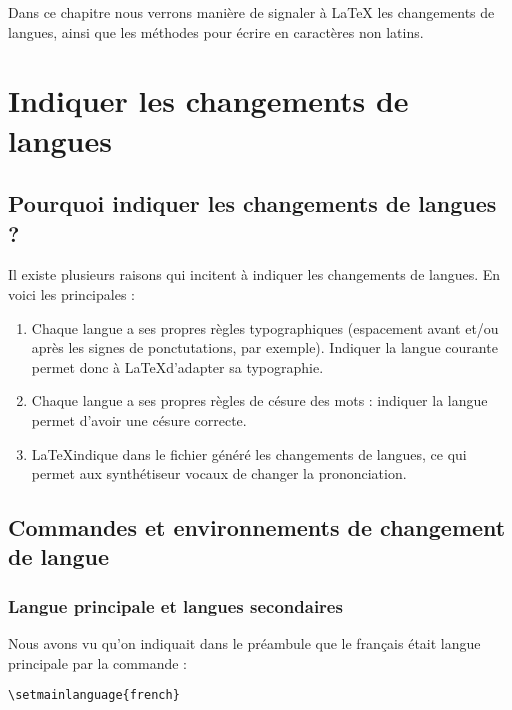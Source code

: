 \label{i18n}

\begin{prealable}
	Dans ce chapitre nous verrons manière de signaler à LaTeX les changements de langues, ainsi que les méthodes pour écrire en caractères non latins.
\end{prealable}

\section{Indiquer les changements de langues}

\subsection{Pourquoi indiquer les changements de langues ?}

Il existe plusieurs raisons qui incitent à indiquer les changements de langues. En voici les principales :
\begin{enumerate}
\item Chaque langue  a ses propres règles typographiques (espacement avant et/ou après les signes de ponctutations, par exemple). Indiquer la langue courante permet donc à \LaTeX d'adapter sa typographie.
\item Chaque langue a ses propres règles de césure des mots : indiquer la langue permet d'avoir une césure correcte.
\item \LaTeX indique dans le fichier généré les changements de  langues, ce qui permet aux synthétiseur vocaux  de changer la prononciation.
\end{enumerate}


\subsection{Commandes et environnements de changement de langue}

\subsubsection{Langue principale et langues secondaires}

Nous avons vu qu'on indiquait dans le préambule que le français était langue principale par la commande : 

\begin{verbatim}
\setmainlanguage{french}
\end{verbatim}

